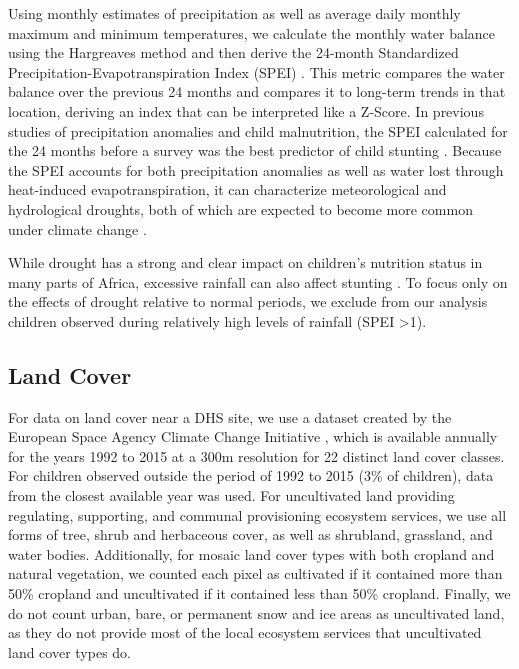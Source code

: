 \documentclass[titlepage]{article}
\begin{document}
Using monthly estimates of precipitation as well as average daily monthly maximum and minimum temperatures, we calculate the monthly water balance using the Hargreaves method \citep{Hargreaves1982} and then derive the 24-month Standardized Precipitation-Evapotranspiration Index (SPEI) \citep{Begueria2014}.  This metric compares the water balance over the previous 24 months and compares it to long-term trends in that location, deriving an index that can be interpreted like a Z-Score.  In previous studies of precipitation anomalies and child malnutrition, the SPEI calculated for the 24 months before a survey was the best predictor of child stunting \citep{Cooper2019a}.  Because the SPEI accounts for both precipitation anomalies as well as water lost through heat-induced evapotranspiration, it can characterize meteorological and hydrological droughts, both of which are expected to become more common under climate change \citep{Dai2013}.

While drought has a strong and clear impact on children's nutrition status in many parts of Africa, excessive rainfall can also affect stunting \citep{Cooper2019a, dimitrova2020monsoon}.  To focus only on the effects of drought relative to normal periods, we exclude from our analysis children observed during relatively high levels of rainfall (SPEI \textgreater 1).

\subsection{Land Cover}
For data on land cover near a DHS site, we use a dataset created by the European Space Agency Climate Change Initiative \citep{Defourny2017}, which is available annually for the years 1992 to 2015 at a 300m resolution for 22 distinct land cover classes.  For children observed outside the period of 1992 to 2015 (3\% of children), data from the closest available year was used. For uncultivated land providing regulating, supporting, and communal provisioning ecosystem services, we use all forms of tree, shrub and herbaceous cover, as well as shrubland, grassland, and water bodies.  Additionally, for mosaic land cover types with both cropland and natural vegetation, we counted each pixel as cultivated if it contained more than 50\% cropland and uncultivated if it contained less than 50\% cropland.  Finally, we do not count urban, bare, or permanent snow and ice areas as uncultivated land, as they do not provide most of the local ecosystem services that uncultivated land cover types do.
\end{document}
